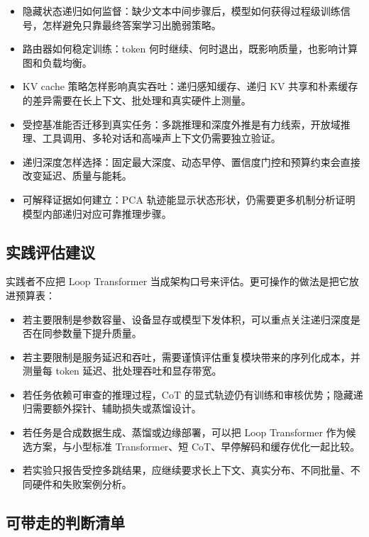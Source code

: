 \begin{itemize}
  \item 隐藏状态递归如何监督：缺少文本中间步骤后，模型如何获得过程级训练信号，怎样避免只靠最终答案学习出脆弱策略。
  \item 路由器如何稳定训练：token 何时继续、何时退出，既影响质量，也影响计算图和负载均衡。
  \item KV cache 策略怎样影响真实吞吐：递归感知缓存、递归 KV 共享和朴素缓存的差异需要在长上下文、批处理和真实硬件上测量。
  \item 受控基准能否迁移到真实任务：多跳推理和深度外推是有力线索，开放域推理、工具调用、多轮对话和高噪声上下文仍需要独立验证。
  \item 递归深度怎样选择：固定最大深度、动态早停、置信度门控和预算约束会直接改变延迟、质量与能耗。
  \item 可解释证据如何建立：PCA 轨迹能显示状态形状，仍需要更多机制分析证明模型内部递归对应可靠推理步骤。
\end{itemize}

\subsection{实践评估建议}

实践者不应把 Loop Transformer 当成架构口号来评估。更可操作的做法是把它放进预算表：

\begin{itemize}
  \item 若主要限制是参数容量、设备显存或模型下发体积，可以重点关注递归深度是否在同参数量下提升质量。
  \item 若主要限制是服务延迟和吞吐，需要谨慎评估重复模块带来的序列化成本，并测量每 token 延迟、批处理吞吐和显存带宽。
  \item 若任务依赖可审查的推理过程，CoT 的显式轨迹仍有训练和审核优势；隐藏递归需要额外探针、辅助损失或蒸馏设计。
  \item 若任务是合成数据生成、蒸馏或边缘部署，可以把 Loop Transformer 作为候选方案，与小型标准 Transformer、短 CoT、早停解码和缓存优化一起比较。
  \item 若实验只报告受控多跳结果，应继续要求长上下文、真实分布、不同批量、不同硬件和失败案例分析。
\end{itemize}

\subsection{可带走的判断清单}

